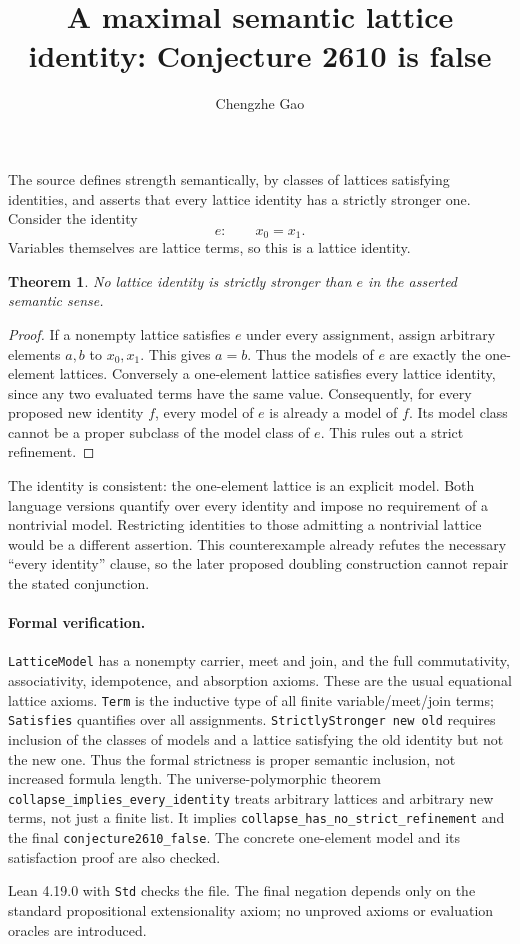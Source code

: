 \documentclass[11pt]{article}
\newtheorem{theorem}{Theorem}
\begin{document}
\title{A maximal semantic lattice identity: Conjecture 2610 is false}
\author{Chengzhe Gao}\date{}\maketitle
The source defines strength semantically, by classes of lattices satisfying
identities, and asserts that every lattice identity has a strictly stronger
one. Consider the identity
\[
 e:\qquad x_0=x_1.
\]
Variables themselves are lattice terms, so this is a lattice identity.

\begin{theorem}
No lattice identity is strictly stronger than $e$ in the asserted semantic
sense.
\end{theorem}
\begin{proof}
If a nonempty lattice satisfies $e$ under every assignment, assign arbitrary
elements $a,b$ to $x_0,x_1$. This gives $a=b$. Thus the models of $e$ are
exactly the one-element lattices. Conversely a one-element lattice
satisfies every lattice identity, since any two evaluated terms have the
same value. Consequently, for every proposed new identity $f$, every
model of $e$ is already a model of $f$. Its model class cannot be a proper
subclass of the model class of $e$. This rules out a strict refinement.
\end{proof}

The identity is consistent: the one-element lattice is an explicit model.
Both language versions quantify over every identity and impose no
requirement of a nontrivial model. Restricting identities to those admitting
a nontrivial lattice would be a different assertion. This counterexample
already refutes the necessary ``every identity'' clause, so the later
proposed doubling construction cannot repair the stated conjunction.

\paragraph{Formal verification.}
\texttt{LatticeModel} has a nonempty carrier, meet and join, and the full
commutativity, associativity, idempotence, and absorption axioms. These are
the usual equational lattice axioms. \texttt{Term} is the inductive type of
all finite variable/meet/join terms; \texttt{Satisfies} quantifies over all
assignments. \texttt{StrictlyStronger new old} requires inclusion of the
classes of models and a lattice satisfying the old identity but not the new
one. Thus the formal strictness is proper semantic inclusion, not increased
formula length. The universe-polymorphic theorem
\texttt{collapse\_\allowbreak{}implies\_\allowbreak{}every\_\allowbreak{}identity} treats arbitrary lattices and
arbitrary new terms, not just a finite list. It implies
\texttt{collapse\_\allowbreak{}has\_\allowbreak{}no\_\allowbreak{}strict\_\allowbreak{}refinement} and the final
\texttt{conjecture2610\_\allowbreak{}false}. The concrete one-element model and its
satisfaction proof are also checked.

Lean 4.19.0 with \texttt{Std} checks the file. The final negation depends
only on the standard propositional extensionality axiom; no unproved
axioms or evaluation oracles are introduced.
\end{document}
